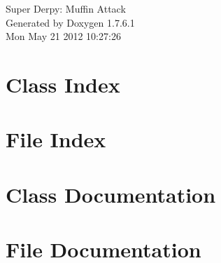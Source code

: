 \documentclass[a4paper]{book}
\begin{document}
\hypersetup{pageanchor=false,citecolor=blue}
\begin{titlepage}
\vspace*{7cm}
\begin{center}
{\Large \-Super \-Derpy\-: \-Muffin \-Attack }\\
\vspace*{1cm}
{\large \-Generated by Doxygen 1.7.6.1}\\
\vspace*{0.5cm}
{\small Mon May 21 2012 10:27:26}\\
\end{center}
\end{titlepage}
\clearemptydoublepage
{}
\tableofcontents
\clearemptydoublepage
{}
\hypersetup{pageanchor=true,citecolor=blue}
\chapter{\-Class \-Index}

\chapter{\-File \-Index}

\chapter{\-Class \-Documentation}













\chapter{\-File \-Documentation}




























\printindex
\end{document}
